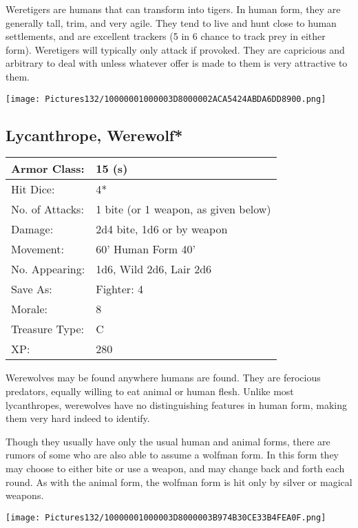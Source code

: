 \documentclass[a4paper,twoside,openany,10pt]{book}
\begin{document}
\begin{multicols}{2}
Weretigers are humans that can transform into tigers. In human form, they are generally tall, trim, and very agile. They tend to live and hunt close to human settlements, and are excellent trackers (5 in 6 chance to track prey in either form). Weretigers will typically only attack if provoked. They are capricious and arbitrary to deal with unless whatever offer is made to them is very attractive to them.

\begin{center} \texttt{[image: Pictures132/10000001000003D8000002ACA5424ABDA6DD8900.png]} \end{center}


\subsection*{Lycanthrope, Werewolf*}\label{lycanthrope-werewolf}

\begin{tabularx}{0.50\textwidth}{@{}lX@{}}
Armor Class: & 15 (s) \\\hline
Hit Dice: & 4* \\\hline
No. of Attacks: & 1 bite (or 1 weapon, as given below) \\\hline
Damage: & 2d4 bite, 1d6 or by weapon \\\hline
Movement: & 60' Human Form 40' \\\hline
No. Appearing: & 1d6, Wild 2d6, Lair 2d6 \\\hline
Save As: & Fighter: 4 \\\hline
Morale: & 8 \\\hline
Treasure Type: & C \\\hline
XP: & 280 \\\hline
\end{tabularx}\medskip

Werewolves may be found anywhere humans are found. They are ferocious predators, equally willing to eat animal or human flesh. Unlike most lycanthropes, werewolves have no distinguishing features in human form, making them very hard indeed to identify.

Though they usually have only the usual human and animal forms, there are rumors of some who are also able to assume a wolfman form. In this form they may choose to either bite or use a weapon, and may change back and forth each round. As with the animal form, the wolfman form is hit only by silver or magical weapons.

\begin{center} \texttt{[image: Pictures132/10000001000003D8000003B974B30CE33B4FEA0F.png]} \end{center}



\end{multicols}
\end{document}
